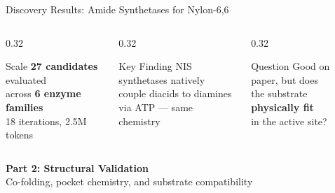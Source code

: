 \documentclass[aspectratio=169, 11pt]{beamer}
\begin{document}
\begin{frame}{Discovery Results: Amide Synthetases for Nylon-6,6}
\vspace{4pt}
\begin{columns}[T]
\begin{column}{0.32\textwidth}
\begin{block}{\scriptsize Scale}
\centering\scriptsize
\textbf{27 candidates} evaluated\\across \textbf{6 enzyme families}\\
18 iterations, 2.5M tokens
\end{block}
\end{column}
\begin{column}{0.32\textwidth}
\begin{exampleblock}{\scriptsize Key Finding}
\centering\scriptsize
NIS synthetases natively\\couple diacids to diamines\\via ATP --- same chemistry
\end{exampleblock}
\end{column}
\begin{column}{0.32\textwidth}
\begin{alertblock}{\scriptsize Question}
\centering\scriptsize
Good on paper, but does\\the substrate \textbf{physically fit}\\in the active site?
\end{alertblock}
\end{column}
\end{columns}
\end{frame}

{
\begin{frame}[plain]
\vfill
\begin{center}
{\Large\bfseries\color{white} Part 2: Structural Validation}\\[10pt]
{\normalsize\color{lightblue!80} Co-folding, pocket chemistry, and substrate compatibility}
\end{center}
\vfill
\end{frame}
}
\end{document}
